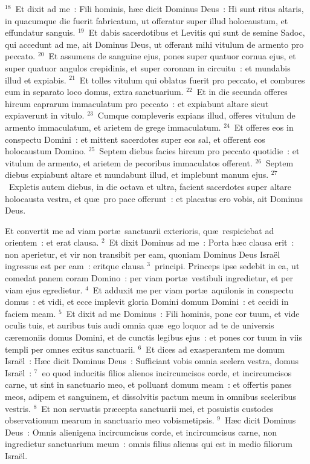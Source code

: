 ${}^{18}$~Et dixit ad me~: Fili hominis, h\ae c dicit Dominus Deus~: Hi sunt ritus altaris, in quacumque die fuerit fabricatum, ut offeratur super illud holocaustum, et effundatur sanguis.
${}^{19}$~Et dabis sacerdotibus et Levitis qui sunt de semine Sadoc, qui accedunt ad me, ait Dominus Deus, ut offerant mihi vitulum de armento pro peccato.
${}^{20}$~Et assumens de sanguine ejus, pones super quatuor cornua ejus, et super quatuor angulos crepidinis, et super coronam in circuitu~: et mundabis illud et expiabis.
${}^{21}$~Et tolles vitulum qui oblatus fuerit pro peccato, et combures eum in separato loco domus, extra sanctuarium.
${}^{22}$~Et in die secunda offeres hircum caprarum immaculatum pro peccato~: et expiabunt altare sicut expiaverunt in vitulo.
${}^{23}$~Cumque compleveris expians illud, offeres vitulum de armento immaculatum, et arietem de grege immaculatum.
${}^{24}$~Et offeres eos in conspectu Domini~: et mittent sacerdotes super eos sal, et offerent eos holocaustum Domino.
${}^{25}$~Septem diebus facies hircum pro peccato quotidie~: et vitulum de armento, et arietem de pecoribus immaculatos offerent.
${}^{26}$~Septem diebus expiabunt altare et mundabunt illud, et implebunt manum ejus.
${}^{27}$~Expletis autem diebus, in die octava et ultra, facient sacerdotes super altare holocausta vestra, et qu\ae\ pro pace offerunt~: et placatus ero vobis, ait Dominus Deus.

\bchapter
\lettrine[lines=3,image=true,loversize=0.05,lraise=-0.03]{E}{}t convertit me ad viam port\ae\ sanctuarii exterioris, qu\ae\ respiciebat ad orientem~: et erat clausa.
${}^{2}$~Et dixit Dominus ad me~: Porta h\ae c clausa erit~: non aperietur, et vir non transibit per eam, quoniam Dominus Deus Isra\"el ingressus est per eam~: eritque clausa
${}^{3}$~principi. Princeps ipse sedebit in ea, ut comedat panem coram Domino~: per viam port\ae\ vestibuli ingredietur, et per viam ejus egredietur.
${}^{4}$~Et adduxit me per viam port\ae\ aquilonis in conspectu domus~: et vidi, et ecce implevit gloria Domini domum Domini~: et cecidi in faciem meam.
${}^{5}$~Et dixit ad me Dominus~: Fili hominis, pone cor tuum, et vide oculis tuis, et auribus tuis audi omnia qu\ae\ ego loquor ad te de universis c\ae remoniis domus Domini, et de cunctis legibus ejus~: et pones cor tuum in viis templi per omnes exitus sanctuarii.
${}^{6}$~Et dices ad exasperantem me domum Isra\"el~: H\ae c dicit Dominus Deus~: Sufficiant vobis omnia scelera vestra, domus Isra\"el~:
${}^{7}$~eo quod inducitis filios alienos incircumcisos corde, et incircumcisos carne, ut sint in sanctuario meo, et polluant domum meam~: et offertis panes meos, adipem et sanguinem, et dissolvitis pactum meum in omnibus sceleribus vestris.
${}^{8}$~Et non servastis pr\ae cepta sanctuarii mei, et posuistis custodes observationum mearum in sanctuario meo vobismetipsis.
${}^{9}$~H\ae c dicit Dominus Deus~: Omnis alienigena incircumcisus corde, et incircumcisus carne, non ingredietur sanctuarium meum~: omnis filius alienus qui est in medio filiorum Isra\"el.


